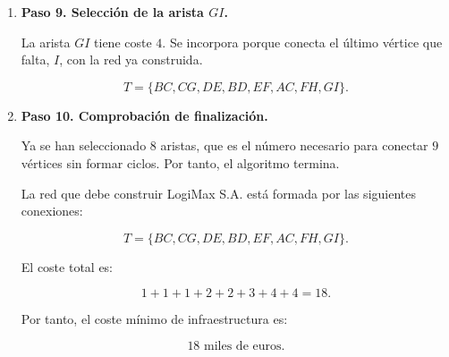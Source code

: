\begin{enumerate}
\[
T=\{BC,CG,DE,BD,EF,AC,FH\}.
\]


\item \textbf{Paso 9. Selección de la arista $GI$.}

La arista $GI$ tiene coste $4$. Se incorpora porque conecta el último vértice que falta, $I$, con la red ya construida.

\[
T=\{BC,CG,DE,BD,EF,AC,FH,GI\}.
\]


\item \textbf{Paso 10. Comprobación de finalización.}

Ya se han seleccionado $8$ aristas, que es el número necesario para conectar $9$ vértices sin formar ciclos. Por tanto, el algoritmo termina.

La red que debe construir LogiMax S.A. está formada por las siguientes conexiones:

\[
\boxed{
T=\{BC,CG,DE,BD,EF,AC,FH,GI\}.
}
\]

El coste total es:

\[
1+1+1+2+2+3+4+4=18.
\]

Por tanto, el coste mínimo de infraestructura es:

\[
\boxed{18\text{ miles de euros}}.
\]



\end{enumerate}
